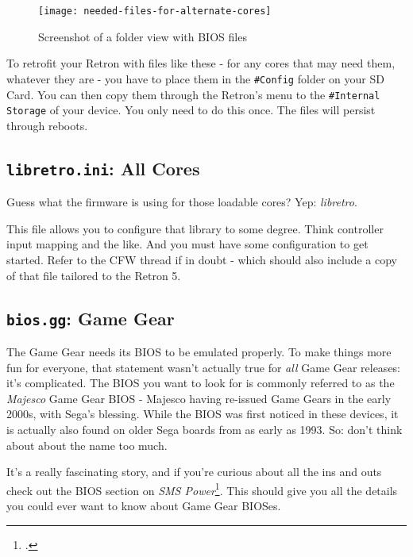 \documentclass[english]{retronlabo-manual}
\begin{document}
\begin{figure}[h]
\caption{Screenshot of a folder view with BIOS files}
\texttt{[image: needed-files-for-alternate-cores]}
\label{fig:needed-files-for-alternate-cores}
\end{figure}

To retrofit your Retron with files like these - for any cores that may need them, whatever they are - you have to place them in the \texttt{\#Config} folder on your SD Card. You can then copy them through the Retron's menu to the \texttt{\#Internal Storage} of your device. You only need to do this once. The files will persist through reboots.

\clearpage

\subsection{\texttt{libretro.ini}: All Cores}

Guess what the firmware is using for those loadable cores? Yep: \emph{libretro}.

This file allows you to configure that library to some degree. Think controller input mapping and the like. And you must have some configuration to get started. Refer to the CFW thread if in doubt - which should also include a copy of that file tailored to the Retron 5.

\subsection{\texttt{bios.gg}: Game Gear}

The Game Gear needs its BIOS to be emulated properly. To make things more fun for everyone, that statement wasn't actually true for \emph{all} Game Gear releases: it's complicated. The BIOS you want to look for is commonly referred to as the \emph{Majesco} Game Gear BIOS - Majesco having re-issued Game Gears in the early 2000s, with Sega's blessing. While the BIOS was first noticed in these devices, it is actually also found on older Sega boards from as early as 1993. So: don't think about about the name too much.

It's a really fascinating story, and if you're curious about all the ins and outs check out the BIOS section on \emph{SMS Power}\footcite{ref:smsp-bios}. This should give you all the details you could ever want to know about Game Gear BIOSes.
\end{document}
